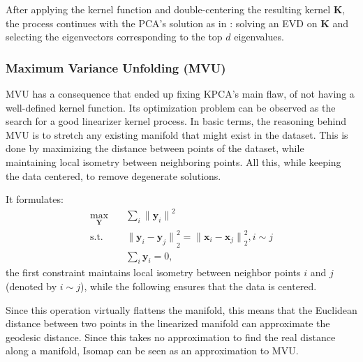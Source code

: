             After applying the kernel function and double-centering the resulting kernel $\boldsymbol{K}$, the process continues with the \ac{PCA}'s solution as in : solving an \ac{EVD} on $\boldsymbol{K}$ and selecting the eigenvectors corresponding to the top $d$ eigenvalues.


        \subsubsection{Maximum Variance Unfolding (MVU)}

            \ac{MVU} \cite{mvu} has a consequence that ended up fixing \ac{KPCA}'s main flaw, of not having a well-defined kernel function. Its optimization problem can be observed as the search for a good linearizer kernel process. In basic terms, the reasoning behind \ac{MVU} is to stretch any existing manifold that might exist in the dataset. This is done by maximizing the distance between points of the dataset, while maintaining local isometry between neighboring points. All this, while keeping the data centered, to remove degenerate solutions.
            
            It formulates:
            \begin{align}
                \max_{\boldsymbol{Y}} \quad & \sum_{i} {\| \boldsymbol{y}_i \|}^2 \\
                \textrm{s.t.} \quad 
                    & {\| \boldsymbol{y}_i - \boldsymbol{y}_j \|}_2^2 = {\| \boldsymbol{x}_i - \boldsymbol{x}_j \|}_2^2, i \sim j \\
                    & \sum_i \boldsymbol{y}_i = 0,
            \end{align}
            the first constraint maintains local isometry between neighbor points $i$ and $j$ (denoted by $i \sim j$), while the following ensures that the data is centered.

            Since this operation virtually flattens the manifold, this means that the Euclidean distance between two points in the linearized manifold can approximate the geodesic distance. Since this takes no approximation to find the real distance along a manifold, \ac{Isomap} can be seen as an approximation to \ac{MVU}.

